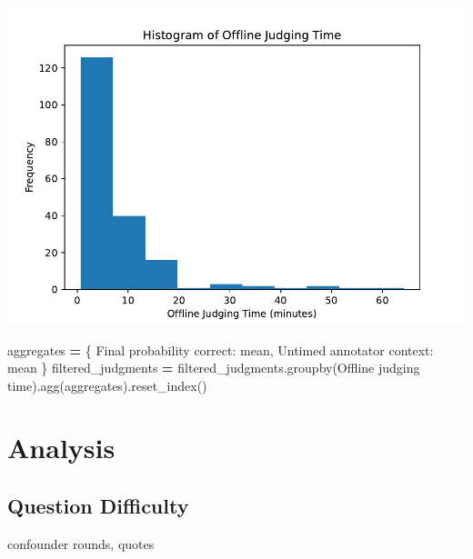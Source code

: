 \documentclass[
]{article}
\newenvironment{Shaded}{\begin{snugshade}}{\end{snugshade}}
\newcommand{\NormalTok}[1]{#1}
\newcommand{\OperatorTok}[1]{\textcolor[rgb]{0.81,0.36,0.00}{\textbf{#1}}}
\newcommand{\StringTok}[1]{\textcolor[rgb]{0.31,0.60,0.02}{#1}}
\begin{document}
\includegraphics{debate-2309_files/figure-latex/TODO offline judging-1.pdf}

\begin{Shaded}
\begin{Highlighting}[]

\NormalTok{aggregates }\OperatorTok{=}\NormalTok{ \{}
    \StringTok{\textquotesingle{}Final probability correct\textquotesingle{}}\NormalTok{: }\StringTok{\textquotesingle{}mean\textquotesingle{}}\NormalTok{,}
    \StringTok{\textquotesingle{}Untimed annotator context\textquotesingle{}}\NormalTok{: }\StringTok{\textquotesingle{}mean\textquotesingle{}}
\NormalTok{\}}
\NormalTok{filtered\_judgments }\OperatorTok{=}\NormalTok{ filtered\_judgments.groupby(}\StringTok{\textquotesingle{}Offline judging time\textquotesingle{}}\NormalTok{).agg(aggregates).reset\_index()}
\end{Highlighting}
\end{Shaded}

\hypertarget{analysis}{%
\section{Analysis}\label{analysis}}

\hypertarget{question-difficulty}{%
\subsection{Question Difficulty}\label{question-difficulty}}

confounder rounds, quotes
\end{document}

